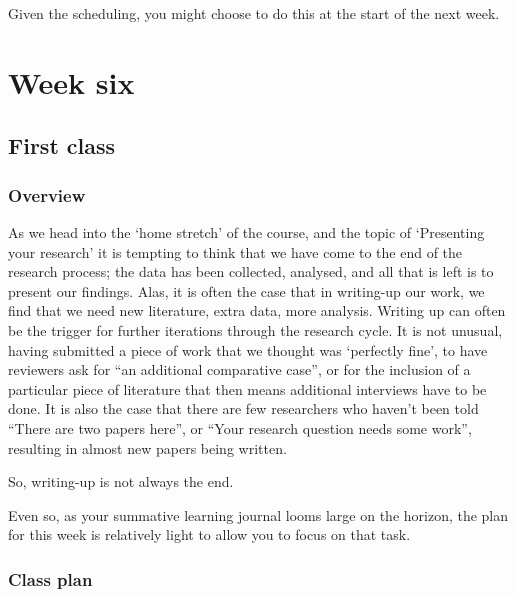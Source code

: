\documentclass[]{book}
\theoremstyle{definition}
\theoremstyle{definition}
\theoremstyle{definition}
\theoremstyle{remark}
\begin{document}
Given the scheduling, you might choose to do this at the start of the
next week.

\hypertarget{w6-details}{%
\chapter{Week six}\label{w6-details}}

\hypertarget{first-class-5}{%
\section*{First class}\label{first-class-5}}

\hypertarget{overview-10}{%
\subsection*{Overview}\label{overview-10}}

As we head into the `home stretch' of the course, and the topic of
`Presenting your research' it is tempting to think that we have come to
the end of the research process; the data has been collected, analysed,
and all that is left is to present our findings. Alas, it is often the
case that in writing-up our work, we find that we need new literature,
extra data, more analysis. Writing up can often be the trigger for
further iterations through the research cycle. It is not unusual, having
submitted a piece of work that we thought was `perfectly fine', to have
reviewers ask for ``an additional comparative case'', or for the
inclusion of a particular piece of literature that then means additional
interviews have to be done. It is also the case that there are few
researchers who haven't been told ``There are two papers here'', or
``Your research question needs some work'', resulting in almost new
papers being written.

So, writing-up is not always the end.

Even so, as your summative learning journal looms large on the horizon,
the plan for this week is relatively light to allow you to focus on that
task.

\hypertarget{class-plan-10}{%
\subsection*{Class plan}\label{class-plan-10}}
\end{document}
